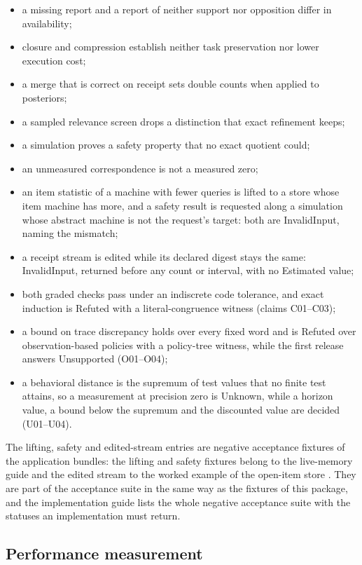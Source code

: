 \documentclass[11pt]{article}
\theoremstyle{definition}
\theoremstyle{plain}
\begin{document}
\begin{itemize}
\item a missing report and a report of neither support nor opposition differ in availability;
\item closure and compression establish neither task preservation nor lower execution cost;
\item a merge that is correct on receipt sets double counts when applied to posteriors;
\item a sampled relevance screen drops a distinction that exact refinement keeps;
\item a simulation proves a safety property that no exact quotient could;
\item an unmeasured correspondence is not a measured zero;
\item an item statistic of a machine with fewer queries is lifted to a store whose item machine has
more, and a safety result is requested along a simulation whose abstract machine is not the
request's target: both are InvalidInput, naming the mismatch;
\item a receipt stream is edited while its declared digest stays the same: InvalidInput, returned
before any count or interval, with no Estimated value;
\item both graded checks pass under an indiscrete code tolerance, and exact induction is Refuted
with a literal-congruence witness (claims C01--C03);
\item a bound on trace discrepancy holds over every fixed word and is Refuted over
observation-based policies with a policy-tree witness, while the first release answers Unsupported
(O01--O04);
\item a behavioral distance is the supremum of test values that no finite test attains, so a
measurement at precision zero is Unknown, while a horizon value, a bound below the supremum and the
discounted value are decided (U01--U04).
\end{itemize}
The lifting, safety and edited-stream entries are negative acceptance fixtures of the application
bundles: the lifting and safety fixtures belong to the live-memory guide \cite{livememory} and the
edited stream to the worked example of the open-item store \cite{wmtmexample}. They are part of the acceptance
suite in the same way
as the fixtures of this package, and the implementation guide lists the whole negative acceptance
suite with the statuses an implementation must return.

\subsection{Performance measurement}
\end{document}
